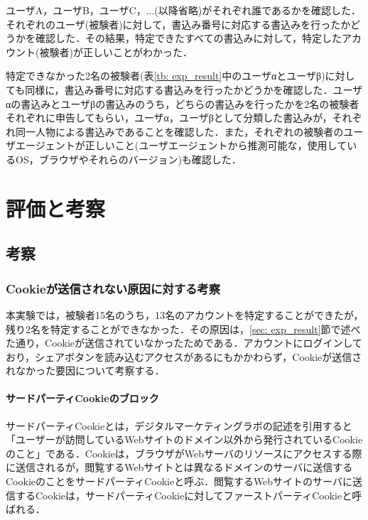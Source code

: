 \documentclass[10pt, a4paper]{jreport}
\begin{document}
ユーザA，ユーザB，ユーザC，...(以降省略)がそれぞれ誰であるかを確認した．それぞれのユーザ(被験者)に対して，書込み番号に対応する書込みを行ったかどうかを確認した．その結果，特定できたすべての書込みに対して，特定したアカウント(被験者)が正しいことがわかった．

特定できなかった2名の被験者(表\ref{tb: exp_result}中のユーザαとユーザβ)に対しても同様に，書込み番号に対応する書込みを行ったかどうかを確認した．ユーザαの書込みとユーザβの書込みのうち，どちらの書込みを行ったかを2名の被験者それぞれに申告してもらい，ユーザα，ユーザβとして分類した書込みが，それぞれ同一人物による書込みであることを確認した．また，それぞれの被験者のユーザエージェントが正しいこと(ユーザエージェントから推測可能な，使用しているOS，ブラウザやそれらのバージョン)も確認した．












\chapter{評価と考察}

\section{考察}
\subsection{Cookieが送信されない原因に対する考察}
本実験では，被験者15名のうち，13名のアカウントを特定することができたが，残り2名を特定することができなかった．その原因は，\ref{sec: exp_result}節で述べた通り，Cookieが送信されていなかったためである．アカウントにログインしており，シェアボタンを読み込むアクセスがあるにもかかわらず，Cookieが送信されなかった要因について考察する．

\subsubsection{サードパーティCookieのブロック}
サードパーティCookieとは，デジタルマーケティングラボの記述を引用すると「ユーザーが訪問しているWebサイトのドメイン以外から発行されているCookieのこと」である\cite{what_is_third_party_cookie}．Cookieは，ブラウザがWebサーバのリソースにアクセスする際に送信されるが，閲覧するWebサイトとは異なるドメインのサーバに送信するCookieのことをサードパーティCookieと呼ぶ．閲覧するWebサイトのサーバに送信するCookieは，サードパーティCookieに対してファーストパーティCookieと呼ばれる．
\end{document}
